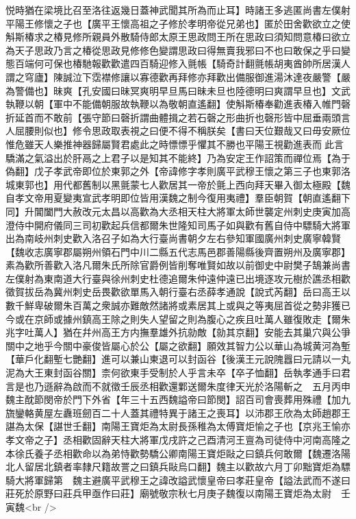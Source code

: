 悦時猶在梁境比召至洛往返幾日蓋神武聞其所為而止耳】時諸王多逃匿尚書左僕射平陽王修懷之子也【廣平王懷高祖之子修於孝明帝從兄弟也】匿於田舍歡欲立之使斛斯椿求之椿見修所親員外散騎侍郎太原王思政問王所在思政曰須知問意椿曰欲立為天子思政乃言之椿從思政見修修色變謂思政曰得無賣我邪曰不也曰敢保之乎曰變態百端何可保也椿馳報歡歡遣四百騎迎修入氈帳【騎奇計翻氈帳胡夷酋帥所居漢人謂之穹廬】陳誠泣下霑襟修讓以寡德歡再拜修亦拜歡出備服御進湯沐達夜嚴警【嚴為警備也】昧爽【孔安國曰昧冥爽明早旦馬曰昧未旦也陸德明曰爽謂早旦也】文武執鞭以朝【軍中不能備朝服故執鞭以為敬朝直遙翻】使斛斯椿奉勸進表椿入帷門磬折延首而不敢前【張守節曰磬折謂曲體揖之若石磬之形曲折也磬形皆中屈垂兩頭言人屈腰則似也】修令思政取表視之曰便不得不稱朕矣【書曰天位艱哉又曰毋安厥位惟危雖天人樂推神器歸屬賢君處此之時慓慓乎懼其不勝也平陽王視勸進表而此言驕滿之氣溢出於肝鬲之上君子以是知其不能終】乃為安定王作詔策而禪位焉【為于偽翻】戊子孝武帝即位於東郭之外【帝諱修字孝則廣平武穆王懷之第三子也東郭洛城東郭也】用代都舊制以黑氈蒙七人歡居其一帝於氈上西向拜天畢入御太極殿【魏自孝文帝用夏變夷宣武孝明即位皆用漢魏之制今復用夷禮】羣臣朝賀【朝直遙翻下同】升閶闔門大赦改元太昌以高歡為大丞相天柱大將軍太師世襲定州刺史庚寅加高澄侍中開府儀同三司初歡起兵信都爾朱世隆知司馬子如與歡有舊自侍中驃騎大將軍出為南岐州刺史歡入洛召子如為大行臺尚書朝夕左右參知軍國廣州刺史廣寧韓賢【魏收志廣寧郡屬朔州領石門中川二縣五代志馬邑郡善陽縣後齊置朔州及廣寧郡】素為歡所善歡入洛凡爾朱氏所除官爵例皆削奪唯賢如故以前御史中尉樊子鵠兼尚書左僕射為東南道大行臺與徐州刺史杜德追爾朱仲遠仲遠已出境逐攻元樹於譙丞相歡徵賀拔岳為冀州刺史岳畏歡欲單馬入朝行臺右丞薛孝通說【說式芮翻】岳曰高王以數千鮮卑破爾朱百萬之衆誠亦難敵然諸將或素居其上或與之等夷屈首從之勢非獲已今或在京師或據州鎮高王除之則失人望留之則為腹心之疾且吐萬人雖復敗走【爾朱兆字吐萬人】猶在幷州高王方内撫羣雄外抗勍敵【勍其京翻】安能去其巢穴與公爭關中之地乎今關中豪俊皆屬心於公【屬之欲翻】願效其智力公以華山為城黄河為塹【華戶化翻塹七艷翻】進可以兼山東退可以封函谷【後漢王元說隗囂曰元請以一丸泥為大王東封函谷關】柰何欲東手受制於人乎言未卒【卒子恤翻】岳執孝通手曰君言是也乃遜辭為啟而不就徵壬辰丞相歡還鄴送爾朱度律天光於洛陽斬之　五月丙申魏主酖節閔帝於門下外省【年三十五西魏謚帝曰節閔】詔百司會喪葬用殊禮【加九旒鑾輅黄屋左纛班劒百二十人蓋其禮特異于諸王之喪耳】以沛郡王欣為太師趙郡王諶為太保【諶世壬翻】南陽王寶炬為太尉長孫稚為太傅寶炬愉之子也【京兆王愉亦孝文帝之子】丞相歡固辭天柱大將軍戊戌許之己酉清河王亶為司徒侍中河南高隆之本徐氏養子丞相歡命以為弟恃歡勢驕公卿南陽王寶炬敺之曰鎮兵何敢爾【魏遷洛陽北人留居北鎮者率隸尺籍故詈之曰鎮兵敺烏口翻】魏主以歡故六月丁卯黜寶炬為驃騎大將軍歸第　魏主避廣平武穆王之諱改謚武懷皇帝曰孝莊皇帝【謚法武而不遂曰莊死於原野曰莊兵甲亟作曰莊】廟號敬宗秋七月庚子魏復以南陽王寶炬為太尉　壬寅魏<br />
